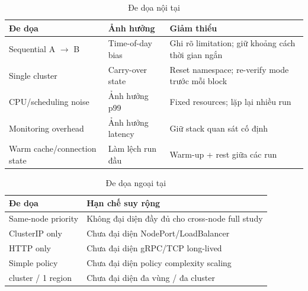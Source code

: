 \begin{table}[H]
\centering
\caption{Đe dọa nội tại}
\label{tab:internal-threats}
\small
\setlength{\tabcolsep}{5pt}
\renewcommand{\arraystretch}{1.15}
\begin{tabularx}{\textwidth}{>{\raggedright\arraybackslash}p{2.8cm} >{\raggedright\arraybackslash}p{2.2cm} X}
\toprule
\textbf{Đe dọa} & \textbf{Ảnh hưởng} & \textbf{Giảm thiểu} \\
\midrule
Sequential A $\rightarrow$ B & Time-of-day bias & Ghi rõ limitation; giữ khoảng cách thời gian ngắn \\
Single cluster & Carry-over state & Reset namespace; re-verify mode trước mỗi block \\
CPU/scheduling noise & Ảnh hưởng p99 & Fixed resources; lặp lại nhiều run \\
Monitoring overhead & Ảnh hưởng latency & Giữ stack quan sát cố định \\
Warm cache/connection state & Làm lệch run đầu & Warm-up + rest giữa các run \\
\bottomrule
\end{tabularx}
\end{table}

\begin{table}[H]
\centering
\caption{Đe dọa ngoại tại}
\label{tab:external-threats}
\small
\setlength{\tabcolsep}{5pt}
\renewcommand{\arraystretch}{1.15}
\begin{tabularx}{\textwidth}{>{\raggedright\arraybackslash}p{3.1cm}X}
\toprule
\textbf{Đe dọa} & \textbf{Hạn chế suy rộng} \\
\midrule
Same-node priority & Không đại diện đầy đủ cho cross-node full study \\
ClusterIP only & Chưa đại diện NodePort/LoadBalancer \\
HTTP only & Chưa đại diện gRPC/TCP long-lived \\
Simple policy & Chưa đại diện policy complexity scaling \\
1 cluster / 1 region & Chưa đại diện đa vùng / đa cluster \\
\bottomrule
\end{tabularx}
\end{table}
